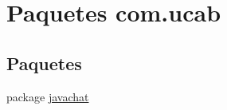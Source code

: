 \hypertarget{namespacecom_1_1ucab}{\section{Paquetes com.\-ucab}
\label{namespacecom_1_1ucab}
}
\subsection*{Paquetes}
\begin{DoxyCompactItemize}
\item 
package \hyperlink{namespacecom_1_1ucab_1_1javachat}{javachat}
\end{DoxyCompactItemize}
